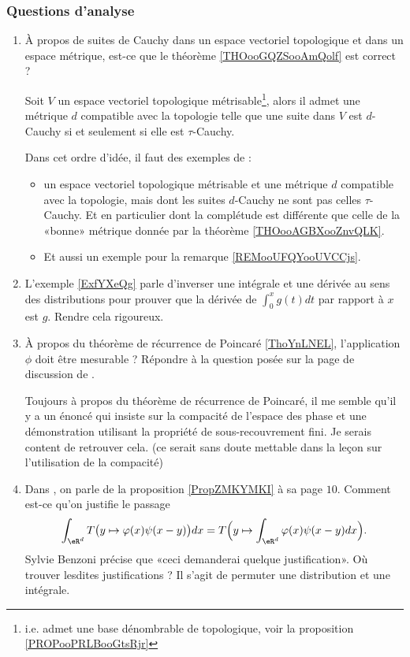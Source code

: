 \subsubsection{Questions d'analyse}

\begin{enumerate}
    \item
        À propos de suites de Cauchy dans un espace vectoriel topologique et dans un espace métrique, est-ce que le théorème \ref{THOooGQZSooAmQolf} est correct ?

        Soit \( V\) un espace vectoriel topologique métrisable\footnote{i.e. admet une base dénombrable de topologique, voir la proposition \ref{PROPooPRLBooGtsRjr}}, alors il admet une métrique \( d\) compatible avec la topologie telle que une suite dans \( V\) est \( d\)-Cauchy si et seulement si elle est \( \tau\)-Cauchy.

        Dans cet ordre d'idée, il faut des exemples de :
        \begin{itemize}
            \item un espace vectoriel topologique métrisable et une métrique \( d\) compatible avec la topologie, mais dont les suites \( d\)-Cauchy ne sont pas celles \( \tau\)-Cauchy. Et en particulier dont la complétude est différente que celle de la «bonne» métrique donnée par la théorème \ref{THOooAGBXooZnvQLK}.
            \item Et aussi un exemple pour la remarque \ref{REMooUFQYooUVCCjs}.
        \end{itemize}
    \item
        L'exemple \ref{ExfYXeQg} parle d'inverser une intégrale et une dérivée au sens des distributions pour prouver que la dérivée de \( \int_0^xg(t)dt\) par rapport à \( x\) est \( g\). Rendre cela rigoureux.
    \item 
        À propos du théorème de récurrence de Poincaré \ref{ThoYnLNEL}, l'application \( \phi\) doit être mesurable ? Répondre à la question posée sur la page de discussion de .

        Toujours à propos du théorème de récurrence de Poincaré, il me semble qu'il y a un énoncé qui insiste sur la compacité de l'espace des phase et une démonstration utilisant la propriété de sous-recouvrement fini. Je serais content de retrouver cela. (ce serait sans doute mettable dans la leçon sur l'utilisation de la compacité)
        \item 
            Dans \cite{OEVAuEz}, on parle de la proposition \ref{PropZMKYMKI} à sa page \( 10\). Comment est-ce qu'on justifie le passage
            \begin{equation}
                \int_{\eR^d}T\big( y\mapsto \varphi(x)\psi(x-y) \big)dx=T\Big( y\mapsto\int_{\eR^d}\varphi(x)\psi(x-y)dx \Big).
            \end{equation}
            Sylvie Benzoni précise que «ceci demanderai quelque justification». Où trouver lesdites justifications ? Il s'agit de permuter une distribution et une intégrale.


\end{enumerate}
